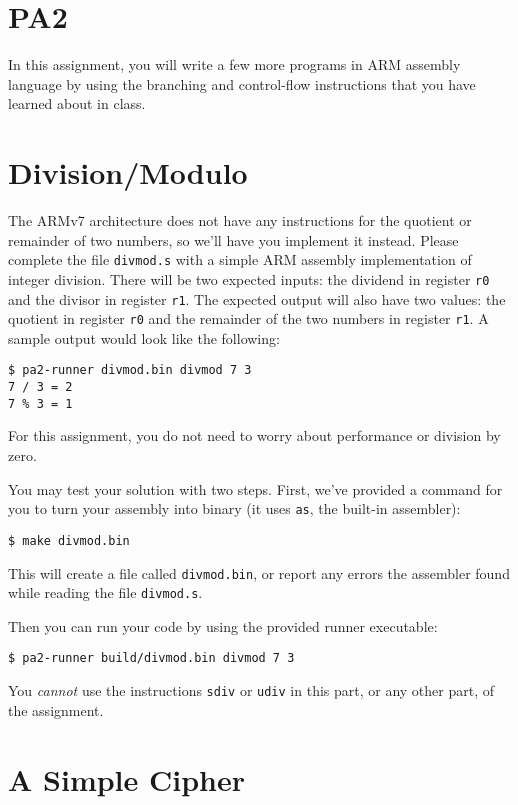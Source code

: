 \documentclass{article}
\def\r#1{\texttt{r#1}}
\begin{document}
\section{PA2}

In this assignment, you will write a few more programs in ARM assembly 
language by using the branching and control-flow instructions that you 
have learned about in class. 

\section{Division/Modulo}

The ARMv7 architecture does not have any instructions for the quotient
or remainder of two numbers, so we'll have you implement it instead. Please 
complete the file \texttt{divmod.s} with a simple ARM assembly implementation 
of integer division. There will be two expected inputs: the dividend in 
register \r{0} and the divisor in register \r{1}. The expected output will 
also have two values: the quotient in register \r{0} and the remainder of the 
two numbers in register \r{1}. A sample output would look like the following:

\begin{verbatim}
$ pa2-runner divmod.bin divmod 7 3
7 / 3 = 2
7 % 3 = 1
\end{verbatim}

For this assignment, you do not need to worry about performance or division
by zero.

You may test your solution with two steps. First, we've provided a command for
you to turn your assembly into binary (it uses {\tt as}, the built-in
assembler):

\begin{verbatim}
$ make divmod.bin
\end{verbatim}

This will create a file called {\tt divmod.bin}, or report any errors the
assembler found while reading the file {\tt divmod.s}.

Then you can run your code by using the provided runner executable:

\begin{verbatim}
$ pa2-runner build/divmod.bin divmod 7 3
\end{verbatim}

You \emph{cannot} use the instructions {\tt sdiv} or {\tt udiv} in this part,
or any other part, of the assignment.

\section{A Simple Cipher}
\end{document}
